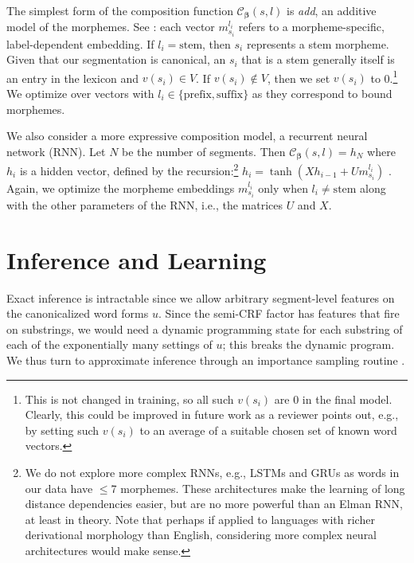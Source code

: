\documentclass[11pt,letterpaper]{article}
\renewcommand{\vec}{\boldsymbol}
\newcommand{\vbeta}{{\vec{\beta}}}
\newcommand{\vm}{m}
\begin{document}

The simplest form of the composition function 
  $\mathcal{C}_{\vbeta}(s, l)$ is \emph{add}, an additive model of the morphemes.
See :
each vector $\vm^{l_i}_{s_i}$ refers to a morpheme-specific,
label-dependent embedding. If $l_i = \text{stem}$, then
$s_i$ represents a stem morpheme. 
Given that our
segmentation is
canonical, an $s_i$ that is a stem generally itself is an entry in the lexicon and
 $v(s_i) \in V$. If
$v(s_i) \not\in V$, then we set $v(s_i)$ to 0.\footnote{This
is not changed in training, so all such $v(s_i)$ are 0 in
the final model. Clearly, this could be improved in future
work as a reviewer points out, e.g., by setting 
such $v(s_i)$ to an average of a suitable chosen set of
known word vectors.}  We optimize
over vectors with $l_i \in \{\text{prefix}, \text{suffix}\}$ as
they correspond to bound morphemes.


We also consider a more expressive composition model,
a recurrent neural network (RNN).
Let  $N$ be the number of segments. Then
$\mathcal{C}_{\vbeta}(s, l) = h_{N}$
where $h_i$ is a hidden vector, defined
by the  recursion:\footnote{We do not explore
  more complex RNNs, e.g., LSTMs \cite{hochreiter1997long} and GRUs \cite{cho2014properties}
  as words in our data have $\leq$7
  morphemes. 
These architectures make the learning
  of long distance dependencies easier, but
  are no more powerful than an Elman RNN, at least in theory. Note that
  perhaps if applied to languages with richer derivational morphology than English,
considering more complex neural architectures would make sense.}
 $ h_i = \tanh\left( X h_{i-1}+U m^{l_i}_{s_i} \right)$ \cite{elman1990finding}.
Again, we optimize the morpheme embeddings $m_{s_i}^{l_i}$ only when $l_i \neq \text{stem}$
along with the other parameters of the RNN, i.e., the matrices $U$ and $X$. 



\section{Inference and Learning}
Exact inference  is intractable since 
we allow arbitrary segment-level features on the canonicalized
word forms $u$. Since the semi-CRF factor has features
  that fire on substrings, we would need a dynamic programming state for each substring of each of the
  exponentially many settings of $u$; this
breaks the dynamic program. We thus turn to approximate inference through
an importance sampling routine \cite{rubinstein2011simulation}.
\end{document}
